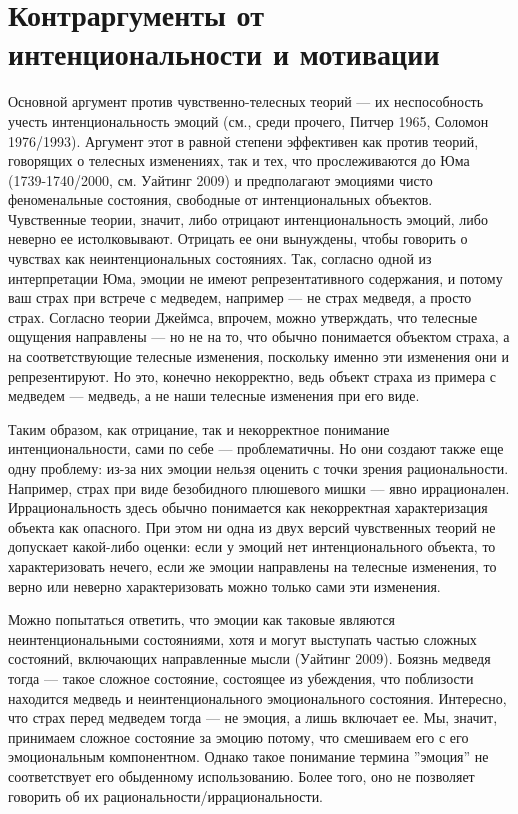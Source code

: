 \documentclass[11pt]{book}
\begin{document}
\section{Контраргументы от интенциональности и мотивации}

Основной аргумент против чувственно-телесных теорий --- их неспособность учесть интенциональность эмоций (см., среди прочего, Питчер 1965, Соломон 1976/1993). Аргумент этот в равной степени эффективен как против теорий, говорящих о телесных изменениях, так и тех, что прослеживаются до Юма (1739-1740/2000, см. Уайтинг 2009) и предполагают эмоциями чисто феноменальные состояния, свободные от интенциональных объектов. Чувственные теории, значит, либо отрицают интенциональность эмоций, либо неверно ее истолковывают. Отрицать ее они вынуждены, чтобы говорить о чувствах как неинтенциональных состояниях. Так, согласно одной из интерпретации Юма, эмоции не имеют репрезентативного содержания, и потому ваш страх при встрече с медведем, например --- не страх медведя, а просто страх. Согласно теории Джеймса, впрочем, можно утверждать, что телесные ощущения направлены --- но не на то, что обычно понимается объектом страха, а на соответствующие телесные изменения, поскольку именно эти изменения они и репрезентируют. Но это, конечно некорректно, ведь объект страха из примера с медведем --- медведь, а не наши телесные изменения при его виде.

Таким образом, как отрицание, так и некорректное понимание интенциональности, сами по себе --- проблематичны. Но они создают также еще одну проблему: из-за них эмоции нельзя оценить с точки зрения рациональности. Например, страх при виде безобидного плюшевого мишки --- явно иррационален. Иррациональность здесь обычно понимается как некорректная характеризация объекта как опасного. При этом ни одна из двух версий чувственных теорий не допускает какой-либо оценки: если у эмоций нет интенционального объекта, то характеризовать нечего, если же эмоции направлены на телесные изменения, то верно или неверно характеризовать можно только сами эти изменения.

Можно попытаться ответить, что эмоции как таковые являются неинтенциональными состояниями, хотя и могут выступать частью сложных состояний, включающих направленные мысли (Уайтинг 2009). Боязнь медведя тогда --- такое сложное состояние, состоящее из убеждения, что поблизости находится медведь и неинтенционального эмоционального состояния. Интересно, что страх перед медведем тогда --- не эмоция, а лишь включает ее. Мы, значит, принимаем сложное состояние за эмоцию потому, что смешиваем его с его эмоциональным компонентном. Однако такое понимание термина ''эмоция'' не соответствует его обыденному использованию. Более того, оно не позволяет говорить об их рациональности/иррациональности.
\end{document}

